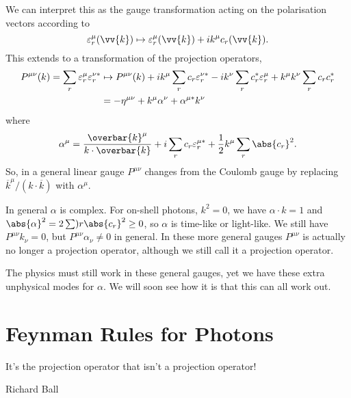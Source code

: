 \documentclass[fleqn]{NotesClass}
\newcommand{\minkowskiMetric}{\eta}
\begin{document}
    We can interpret this as the gauge transformation acting on the polarisation vectors according to
    \begin{equation}
        \varepsilon_r^\mu(\vv{k}) \mapsto \varepsilon_r^\mu(\vv{k}) + ik^\mu c_r(\vv{k}).
    \end{equation}
    This extends to a transformation of the projection operators,
    \begin{align}
        P^{\mu\nu}(k) = \sum_r \varepsilon_r^\mu \varepsilon_r^{\nu*} &\mapsto P^{\mu\nu}(k) + ik^\mu \sum_r c_r\varepsilon_r^{\nu*} - ik^\nu \sum_r c_r^* \varepsilon_r^\mu + k^\mu k^\nu \sum_r c_r c_r^* \notag\\
        &= -\minkowskiMetric^{\mu\nu} + k^\mu\alpha^\nu + \alpha^{\mu*}k^\nu
    \end{align}
    where
    \begin{equation}
        \alpha^\mu = \frac{\overbar{k}^\mu}{k \cdot \overbar{k}} + i \sum_r c_r \varepsilon_r^{\mu*} + \frac{1}{2}k^\mu \sum_r \abs{c_r}^2.
    \end{equation}
    So, in a general linear gauge \(P^{\mu\nu}\) changes from the Coulomb gauge by replacing \(\overbar{k}^\mu/(k \cdot \overbar{k})\) with \(\alpha^\mu\).
    
    In general \(\alpha\) is complex.
    For on-shell photons, \(k^2 = 0\), we have \(\alpha \cdot k = 1\) and \(\abs{\alpha}^2 = 2\sum)r \abs{c_r}^2 \ge 0\), so \(\alpha\) is time-like or light-like.
    We still have \(P^{\mu\nu}k_\nu = 0\), but \(P^{\mu\nu}\alpha_\nu \ne 0\) in general.
    In these more general gauges \(P^{\mu\nu}\) is actually no longer a projection operator, although we still call it a projection operator.
    
    The physics must still work in these general gauges, yet we have these extra unphysical modes for \(\alpha\).
    We will soon see how it is that this can all work out.
    
    \chapter{Feynman Rules for Photons}
    \epigraph{It's the projection operator that isn't a projection operator!}{Richard Ball}
\end{document}
